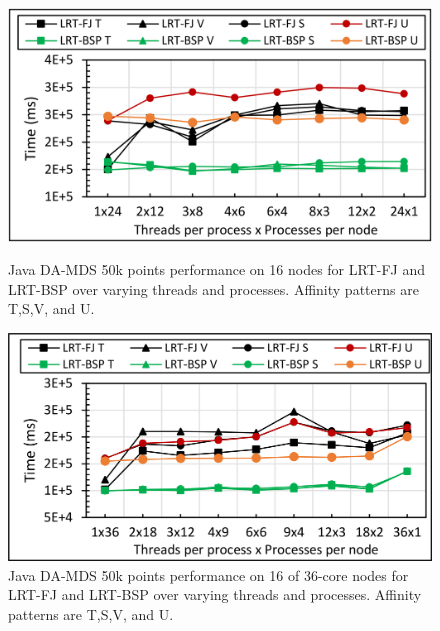 \documentclass[10pt, conference, compsocconf]{IEEEtran}
\begin{document}
\begin{figure}[!htb]
	\begin{minipage}{0.49\textwidth}
        \centering
        \includegraphics[width=1\columnwidth]{images/fig_damds_50k_binding_patterns}
        \caption{Java DA-MDS 50k points performance on 16 nodes for \ac{LRT-FJ} and \ac{LRT-BSP} over varying threads and processes. Affinity patterns are T,S,V, and U.}
        \label{fig:fig_damds_50k_binding_patterns}
    \end{minipage}
    \hspace{1.4mm}
    \begin{minipage}{0.49\textwidth}
        \centering
        \includegraphics[width=1\columnwidth]{images/fig_damds_50k_binding_patterns_on_36core_nodes}
        \caption{Java DA-MDS 50k points performance on 16 of 36-core nodes for \ac{LRT-FJ} and \ac{LRT-BSP} over varying threads and processes. Affinity patterns are T,S,V, and U.}
        \label{fig:fig_damds_50k_binding_patterns_on_36core_nodes}
    \end{minipage}
\end{figure}
\end{document}
